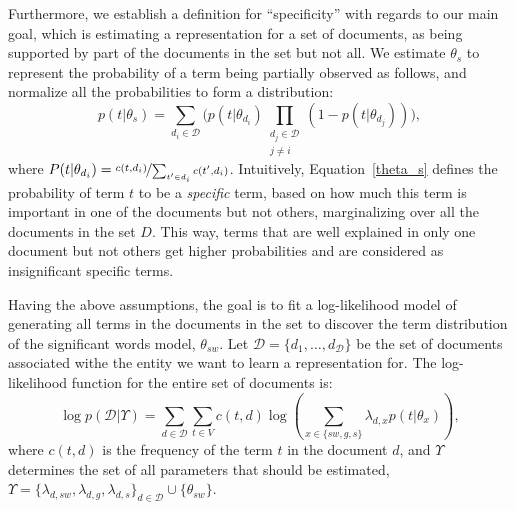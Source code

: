 Furthermore, we establish a definition for ``specificity'' with regards to our main goal, which is estimating a representation for a set of documents, as being supported by part of the documents in the set but not all. We estimate $\theta_s$ to represent the probability of a term being partially observed as follows, and normalize all the probabilities to form a distribution:
\begin{equation}
p(t|\theta_s) = 
\sum_{d_i\in \mathcal{D}} 
\bigg(
p(t|\theta_{d_i}) \prod_{\substack{d_j\in \mathcal{D} \\ j \neq i}} (1-p(t|\theta_{d_j}))
\bigg),
\label{theta_s}
\end{equation}
where $P(t|\theta_{d_i}) = \nicefrac{c(t,d_i)}{\sum_{t' \in d_i} c(t',d_i)}$. 
Intuitively, Equation~\ref{theta_s} defines the probability of term $t$ to be a \emph{specific} term, based on how much this term is important in one of the documents but not others, marginalizing over all the documents in the set $D$. This way, terms that are well explained in only one document but not others get higher probabilities and are considered as insignificant specific terms.

Having the above assumptions, the goal is to fit a log-likelihood model of generating all terms in the documents in the set to discover the term distribution of the significant words model, $\theta_{sw}$. 
Let $\mathcal{D} = \{d_1, \ldots, d_{\mathcal{D}}\}$ be the set of documents associated withe the entity we want to learn a representation for. The log-likelihood function for the entire set of documents is:
\begin{equation}
\log p(\mathcal{D}|\Upsilon) = \sum_{d \in \mathcal{D}}\sum_{t \in V} c(t,d) \log \left( \sum_{x\in\{sw,g,s\}}\lambda_{d,x} p(t|\theta_x)\right),
\end{equation}
where $c(t,d)$ is the frequency of the term $t$ in the document $d$, and $\Upsilon$ determines the set of all parameters that should be estimated, $\Upsilon =\{\lambda_{d,sw}, \lambda_{d,g}, \lambda_{d,s} \}_{d \in \mathcal{D}} \cup \{\theta_{sw}\}$. 


